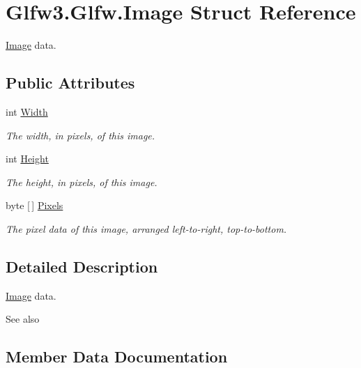 \hypertarget{struct_glfw3_1_1_glfw_1_1_image}{}\section{Glfw3.\+Glfw.\+Image Struct Reference}
\label{struct_glfw3_1_1_glfw_1_1_image}


\mbox{\hyperlink{struct_glfw3_1_1_glfw_1_1_image}{Image}} data.  


\subsection*{Public Attributes}
\begin{DoxyCompactItemize}
\item 
int \mbox{\hyperlink{struct_glfw3_1_1_glfw_1_1_image_a2be52a618928d3ac669ece202178770a}{Width}}
\begin{DoxyCompactList}\small\item\em The width, in pixels, of this image. \end{DoxyCompactList}\item 
int \mbox{\hyperlink{struct_glfw3_1_1_glfw_1_1_image_a301d1886581e3372e22717acb9f46be7}{Height}}
\begin{DoxyCompactList}\small\item\em The height, in pixels, of this image. \end{DoxyCompactList}\item 
byte \mbox{[}$\,$\mbox{]} \mbox{\hyperlink{struct_glfw3_1_1_glfw_1_1_image_a419d6f51ba261e2cd24f075be7db6024}{Pixels}}
\begin{DoxyCompactList}\small\item\em The pixel data of this image, arranged left-\/to-\/right, top-\/to-\/bottom. \end{DoxyCompactList}\end{DoxyCompactItemize}


\subsection{Detailed Description}
\mbox{\hyperlink{struct_glfw3_1_1_glfw_1_1_image}{Image}} data. 

\begin{DoxySeeAlso}{See also}



\end{DoxySeeAlso}


\subsection{Member Data Documentation}
\mbox{\label{struct_glfw3_1_1_glfw_1_1_image_a301d1886581e3372e22717acb9f46be7}} 
